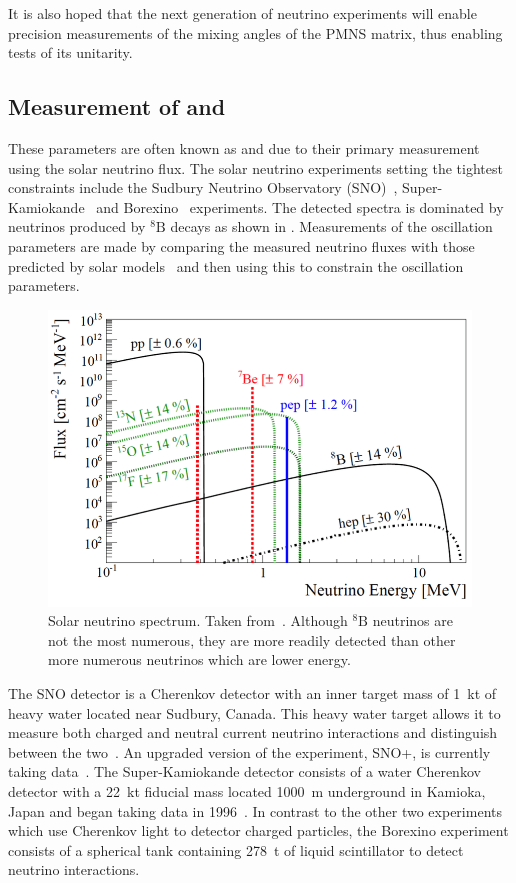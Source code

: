 It is also hoped that the next generation of neutrino experiments will enable precision measurements of the mixing angles of the PMNS matrix, thus enabling tests of its unitarity.

\subsection{Measurement of  and }
\label{sec:theory:currentState:solar}

These parameters are often known as  and  due to their primary measurement using the solar neutrino flux.
The solar neutrino experiments setting the tightest constraints include the Sudbury Neutrino Observatory (SNO)~\cite{snoCombined}, Super-Kamiokande~\cite{superKReview} and Borexino~\cite{borexino} experiments.
The detected \nue spectra is dominated by neutrinos produced by $^{8}\text{B}$ decays as shown in .
Measurements of the oscillation parameters are made by comparing the measured neutrino fluxes with those predicted by solar models~\cite{solarModel} and then using this to constrain the oscillation parameters.

\begin{figure}[h]
  \centering
  \includegraphics[width=.7\linewidth]{files/figures/theory/solarNeutrinoSpectrum}
  \caption{Solar neutrino spectrum. Taken from~\cite{solarNuFluxes}. Although $^{8}\text{B}$ neutrinos are not the most numerous, they are more readily detected than other more numerous neutrinos which are lower energy.}
  \label{fig:solarNuFluxes}
\end{figure}

The SNO detector is a Cherenkov detector with an inner target mass of 1~kt of heavy water located near Sudbury, Canada.
This heavy water target allows it to measure both charged and neutral current neutrino interactions and distinguish between the two~\cite{snoCombined}. An upgraded version of the experiment, SNO+, is currently taking data~\cite{snoPlus}. 
The Super-Kamiokande detector consists of a water Cherenkov detector with a 22~kt fiducial mass located 1000~m underground in Kamioka, Japan and began taking data in 1996~\cite{superKReview}.
In contrast to the other two experiments which use Cherenkov light to detector charged particles, the Borexino experiment consists of a spherical tank containing 278~t of liquid scintillator to detect neutrino interactions.

